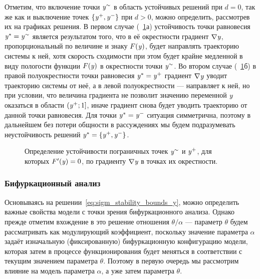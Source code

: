 Отметим, что включение точки $\mathit{y}^{\sim}$ в область устойчивых решений при $d = 0$, так же как и выключение точек $\left\{\mathit{y}^{+}, \mathit{y}^{-}\right\}$ при $d > 0$, можно определить, рассмотрев их на графиках решения. В первом случае (\seefigure~\ref{fig:analysis_sigm_bound_points}а) устойчивость точки равновесия $\mathit{y}^{*} = \mathit{y}^{\sim}$ является результатом того, что в её окрестности градиент $\nabla\mathit{y}$, пропорциональный по величине и знаку $F(\mathit{y})$, будет направлять траекторию системы к ней, хотя скорость сходимости при этом будет крайне медленной в виду пологости функции $F(\mathit{y})$ в окрестности точки $\mathit{y}^{\sim}$. Во втором случае (\seefigure~\ref{fig:analysis_sigm_bound_points}б) в правой полуокрестности точки равновесия $\mathit{y}^{*} = \mathit{y}^{+}$ градиент $\nabla\mathit{y}$ уводит траекторию системы от неё, а в левой полуокрестности --- направляет к ней, но при условии, что величина градиента не позволит значению переменной $\mathit{y}$ оказаться в области $\left(\mathit{y}^{+}; 1\right]$, иначе градиент снова будет уводить траекторию от данной точки равновесия. Для точки $\mathit{y}^{*} = \mathit{y}^{-}$ ситуация симметрична, поэтому в дальнейшем без потери общности в рассуждениях мы будем подразумевать неустойчивость решений $\mathit{y}^{*} = \left\{\mathit{y}^{+}, \mathit{y}^{-}\right\}$.

\begin{figure}[ht]
    \begin{minipage}{\textwidth}
        \caption{Определение устойчивости пограничных точек $\mathit{y}^{\sim}$ и $\mathit{y}^{+}$, для которых $F^{\prime}(\mathit{y}) = 0$, по градиенту $\nabla\mathit{y}$ в точках их окрестности.} 
        \label{fig:analysis_sigm_bound_points}
    \end{minipage}
\end{figure}

\subsubsection{Бифуркационный анализ}

Основываясь на решении~\eqref{eq:sigm_stability_bounds_y}, можно определить важные свойства модели с точки зрения бифуркационного анализа. Однако прежде отметим вхождение в это решение отношения $\theta/\alpha$ --- параметр $\theta$ будем рассматривать как модулирующий коэффициент, поскольку значение параметра $\alpha$ задаёт изначальную (фиксированную) бифуркационную конфигурацию модели, которая затем в процессе функционирования будет меняться в соответствии с текущим значением параметра $\theta$. Поэтому в первую очередь мы рассмотрим влияние на модель параметра $\alpha$, а уже затем параметра $\theta$.

